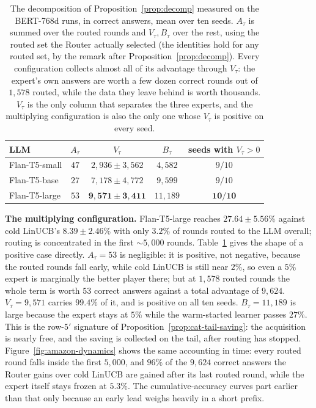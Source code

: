 \documentclass{article}
\theoremstyle{definition}
\theoremstyle{remark}
\theoremstyle{remark}
\begin{document}
\begin{table}[h]
\centering
\caption{The decomposition of Proposition~\ref{prop:decomp} measured on the
BERT-768d runs, in correct answers, mean over ten seeds. $A_\tau$ is summed
over the routed rounds and $V_\tau,B_\tau$ over the rest, using the routed set
the Router actually selected (the identities hold for any routed set, by the
remark after Proposition~\ref{prop:decomp}). Every configuration collects
almost all of its advantage through $V_\tau$: the expert's own answers are
worth a few dozen correct rounds out of $1{,}578$ routed, while the data they
leave behind is worth thousands. $V_\tau$ is the only column that separates
the three experts, and the multiplying configuration is also the only one whose
$V_\tau$ is positive on every seed.}
\label{tab:amazon-decomp}
\small
\begin{tabular}{@{}lcccc@{}}
\toprule
LLM & $A_\tau$ & $V_\tau$ & $B_\tau$ & seeds with $V_\tau>0$ \\
\midrule
Flan-T5-small  & $47$ & $2{,}936\pm3{,}562$ & $4{,}582$ & $9/10$ \\
Flan-T5-base   & $27$ & $7{,}178\pm4{,}772$ & $9{,}599$ & $9/10$ \\
Flan-T5-large  & $53$ & $\mathbf{9{,}571\pm3{,}411}$ & $11{,}189$ & $\mathbf{10/10}$ \\
\bottomrule
\end{tabular}
\end{table}

\textbf{The multiplying configuration.} Flan-T5-large reaches
$27.64\pm5.56\%$ against cold LinUCB's $8.39\pm2.46\%$ with only $3.2\%$ of
rounds routed to the LLM overall; routing is concentrated in the first
$\sim5{,}000$ rounds. Table~\ref{tab:amazon-decomp} gives the shape of a
positive case directly. $A_{\tau}=53$ is negligible: it is positive, not
negative, because the routed rounds fall early, while cold LinUCB is still
near $2\%$, so even a $5\%$ expert is marginally the better player there; but
at $1{,}578$ routed rounds the whole term is worth $53$ correct answers
against a total advantage of $9{,}624$. $V_{\tau}=9{,}571$ carries $99.4\%$ of
it, and is positive on all ten seeds. $B_{\tau}=11{,}189$ is large because the
expert stays at $5\%$ while the warm-started learner passes $27\%$. This is
the row-$5'$ signature of Proposition~\ref{prop:cat-tail-saving}: the
acquisition is nearly free, and the saving is collected on the tail, after
routing has stopped. Figure~\ref{fig:amazon-dynamics} shows the same
accounting in time: every routed round falls inside the first $5{,}000$, and
$96\%$ of the $9{,}624$ correct answers the Router gains over cold LinUCB are
gained after its last routed round, while the expert itself stays frozen at
$5.3\%$. The cumulative-accuracy curves part earlier than that only because an
early lead weighs heavily in a short prefix.
\end{document}
